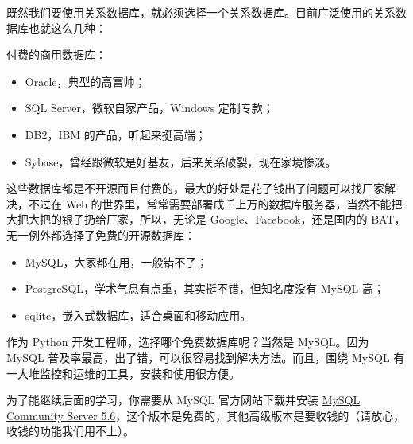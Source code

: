 既然我们要使用关系数据库，就必须选择一个关系数据库。目前广泛使用的关系数据库也就这么几种：

付费的商用数据库：

\begin{itemize}
\item
  Oracle，典型的高富帅；
\item
  SQL Server，微软自家产品，Windows 定制专款；
\item
  DB2，IBM 的产品，听起来挺高端；
\item
  Sybase，曾经跟微软是好基友，后来关系破裂，现在家境惨淡。
\end{itemize}

这些数据库都是不开源而且付费的，最大的好处是花了钱出了问题可以找厂家解决，不过在
Web
的世界里，常常需要部署成千上万的数据库服务器，当然不能把大把大把的银子扔给厂家，所以，无论是
Google、Facebook，还是国内的 BAT，无一例外都选择了免费的开源数据库：

\begin{itemize}
\item
  MySQL，大家都在用，一般错不了；
\item
  PostgreSQL，学术气息有点重，其实挺不错，但知名度没有 MySQL 高；
\item
  sqlite，嵌入式数据库，适合桌面和移动应用。
\end{itemize}

作为 Python 开发工程师，选择哪个免费数据库呢？当然是 MySQL。因为 MySQL
普及率最高，出了错，可以很容易找到解决方法。而且，围绕 MySQL
有一大堆监控和运维的工具，安装和使用很方便。

为了能继续后面的学习，你需要从 MySQL 官方网站下载并安装
\href{http://dev.mysql.com/downloads/mysql/}{MySQL Community Server
5.6}，这个版本是免费的，其他高级版本是要收钱的（请放心，收钱的功能我们用不上）。

